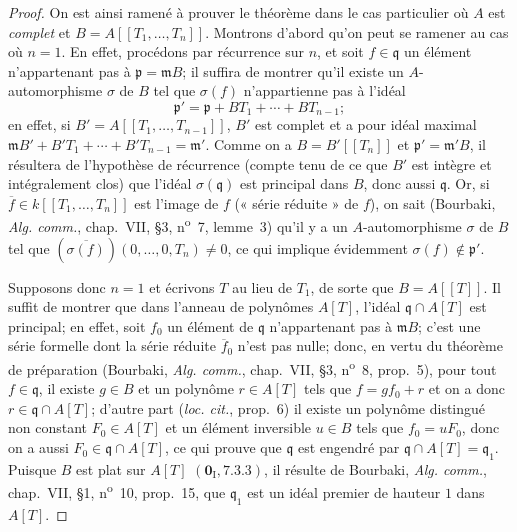 \begin{proof}
On est ainsi ramené à prouver le théorème dans le cas particulier où $A$ est
\emph{complet} et $B=A[[T_1,\ldots,T_n]]$. Montrons d'abord qu'on peut se ramener au
cas où $n=1$. En effet, procédons par récurrence sur $n$, et soit
$f\in\mathfrak q$ un élément n'appartenant pas à $\mathfrak p=\mathfrak mB$; il
suffira de montrer qu'il existe un $A$-automorphisme $\sigma$ de $B$ tel que
$\sigma(f)$ n'appartienne pas à l'idéal
\[
  \mathfrak p'=\mathfrak p+BT_1+\cdots+BT_{n-1};
\]
en effet, si $B'=A[[T_1,\ldots,T_{n-1}]]$, $B'$ est complet et a pour idéal maximal
$\mathfrak mB'+B'T_1+\cdots+B'T_{n-1}=\mathfrak m'$. Comme on a
$B=B'[[T_n]]$ et $\mathfrak p'=\mathfrak m'B$, il résultera de l'hypothèse de
récurrence (compte tenu de ce que $B'$ est intègre et intégralement clos) que l'idéal
$\sigma(\mathfrak q)$ est principal dans $B$, donc aussi $\mathfrak q$. Or, si
$\overline f\in k[[T_1,\ldots,T_n]]$ est l'image de $f$ (« série réduite » de $f$),
on sait (Bourbaki, \emph{Alg. comm.}, chap.~VII, \S3, n\textsuperscript{o}~7,
lemme~3) qu'il y a un $A$-automorphisme $\sigma$ de $B$ tel que
$(\overline{\sigma(f)})(0,\ldots,0,T_n)\neq0$, ce qui implique évidemment
$\sigma(f)\notin\mathfrak p'$.

Supposons donc $n=1$ et écrivons $T$ au lieu de $T_1$, de sorte que $B=A[[T]]$. Il
suffit de montrer que dans l'anneau de polynômes $A[T]$, l'idéal
$\mathfrak q\cap A[T]$ est principal;
en effet, soit $f_0$ un élément de $\mathfrak q$ n'appartenant pas à $\mathfrak mB$;
c'est une série formelle dont la série réduite $\overline f_0$ n'est pas nulle; donc,
en vertu du théorème de préparation (Bourbaki, \emph{Alg. comm.}, chap.~VII, \S3,
n\textsuperscript{o}~8, prop.~5), pour tout $f\in\mathfrak q$, il existe $g\in B$ et
un polynôme $r\in A[T]$ tels que $f=gf_0+r$ et on a donc
$r\in\mathfrak q\cap A[T]$; d'autre part (\emph{loc. cit.}, prop.~6) il existe un
polynôme distingué non constant $F_0\in A[T]$ et un élément inversible $u\in B$ tels
que $f_0=uF_0$, donc on a aussi $F_0\in\mathfrak q\cap A[T]$, ce qui prouve que
$\mathfrak q$ est engendré par $\mathfrak q\cap A[T]=\mathfrak q_1$. Puisque $B$
est plat sur $A[T]$ $(\mathbf 0_{\mathrm I}, 7.3.3)$, il résulte de Bourbaki,
\emph{Alg. comm.}, chap.~VII, \S1, n\textsuperscript{o}~10, prop.~15, que
$\mathfrak q_1$ est un idéal premier de hauteur $1$ dans $A[T]$.


\end{proof}
